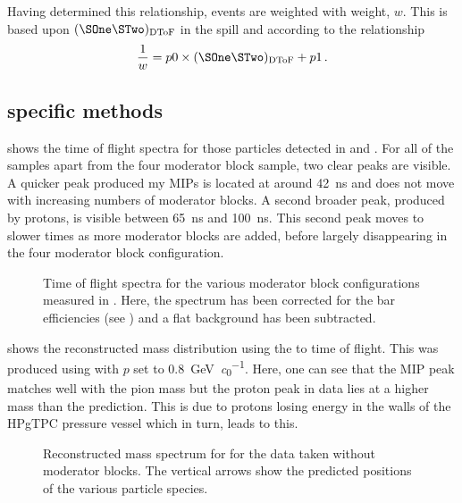 Having determined this relationship, \SThree events are weighted with weight, $w$.
This is based upon $(\SOne\STwo)_{\text{DToF}}$ in the spill and according to the relationship
\begin{equation}
  \frac{1}{w} = p0 \times (\SOne\STwo)_{\text{DToF}} + p1 \,.
\end{equation}
  
\subsection{\SFour specific methods}
\label{sec:hptpc_beam_flux:methods:s4}

 shows the time of flight spectra for those particles detected in \STwo and \SFour.
For all of the samples apart from the four moderator block sample, two clear peaks are visible.
A quicker peak produced my MIPs is located at around \SI{42}{\nano\second} and does not move with increasing numbers of moderator blocks.
A second broader peak, produced by protons, is visible between \SI{65}{\nano\second} and \SI{100}{\nano\second}.
This second peak moves to slower times as more moderator blocks are added, before largely disappearing in the four moderator block configuration.

\begin{figure}[h]
  \begin{adjustbox}{max totalsize=.9\textwidth, center}
    
  \end{adjustbox}
  \caption[Time of flight spectra measured in \SFour]{Time of flight spectra for the various moderator block configurations measured in \SFour. Here, the spectrum has been corrected for the bar efficiencies (see ) and a flat background has been subtracted.}
  \label{fig:s4Tof}
\end{figure}

 shows the reconstructed mass distribution using the \STwo to \SFour time of flight.
This was produced using  with $p$ set to \SI{0.8}{\giga\electronvolt\per\clight}.
Here, one can see that the MIP peak matches well with the pion mass but the proton peak in data lies at a higher mass than the prediction.
This is due to protons losing energy in the walls of the HPgTPC pressure vessel which in turn, leads to this.

\begin{figure}[h]
  \begin{adjustbox}{max totalsize=.9\textwidth, center}
    
  \end{adjustbox}
  \caption[Reconstructed mass spectrum for \SFour]{Reconstructed mass spectrum for \SFour for the data taken without moderator blocks. The vertical arrows show the predicted positions of the various particle species.}
  \label{fig:s4MassDistribution}
\end{figure}

